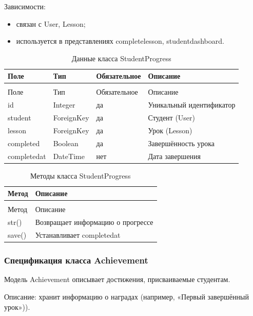 Зависимости:
	\begin{itemize}
		\item связан с User, Lesson;
		\item используется в представлениях completelesson, studentdashboard.
	\end{itemize}


\begin{xltabular}{\textwidth}{|l|l|l|X|}
	\caption{Данные класса StudentProgress\label{tab:studentprogress_attributes}}\\
	\hline
	Поле & Тип & Обязательное & Описание \\ \hline
	\endfirsthead
	\\
	\hline
	Поле & Тип & Обязательное & Описание \\ \hline
	\endhead
	id & Integer & да & Уникальный идентификатор \\ \hline
	student & ForeignKey & да & Студент (User) \\ \hline
	lesson & ForeignKey & да & Урок (Lesson) \\ \hline
	completed & Boolean & да & Завершённость урока \\ \hline
	completedat & DateTime & нет & Дата завершения \\ \hline
\end{xltabular}

\begin{xltabular}{\textwidth}{|l|X|}
	\caption{Методы класса StudentProgress\label{tab:studentprogress_methods}}\\
	\hline
	Метод & Описание \\ \hline
	\endfirsthead
	\\
	\hline
	Метод & Описание \\ \hline
	\endhead
	str() & Возвращает информацию о прогрессе \\ \hline
	save() & Устанавливает completedat \\ \hline
\end{xltabular}

\subsubsection{Спецификация класса Achievement}

Модель Achievement описывает достижения, присваиваемые студентам.


Описание: хранит информацию о наградах (например, «Первый завершённый урок»)).

